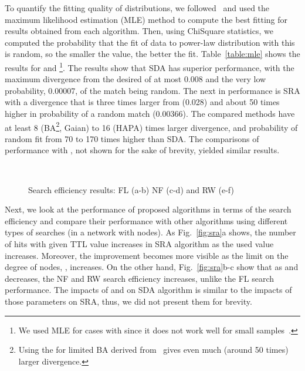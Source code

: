 \documentclass[10pt,journal,cspaper,compsoc]{IEEEtran}
\begin{document}
To quantify the fitting quality of distributions, we followed~\cite{powerlaw1} and used the maximum likelihood estimation (MLE) method to compute the best fitting  for results obtained from each algorithm. Then, using ChiSquare statistics, we computed the probability that the fit of data to power-law distribution with this  is random, so the smaller the value, the better the fit. Table~\ref{table:mle} shows the results for  and  \footnote{We used MLE for cases with  since it does not work well for small samples~\cite{powerlaw1}.}. The results show that SDA has superior performance, with the maximum divergence from the desired  of at most 0.008 and the very low probability, 0.00007, of the match being random. The next in performance is SRA with a divergence that is three times larger from  (0.028) and about 50 times higher in probability of a random match (0.00366). The compared methods have at least 8 (BA\footnote{Using the  for limited BA derived from~\cite{guclu} gives even much (around 50 times) larger divergence.}, Gaian) to 16 (HAPA) times larger divergence, and probability of random fit from 70 to 170 times higher than SDA. The comparisons of performance with , not shown for the sake of brevity, yielded similar results.


\begin{figure*}
\centering
{}
\\
\caption{Search efficiency results: FL (a-b) NF (c-d) and RW (e-f)}
\label{fig:comparison}
\end{figure*}

Next, we look at the performance of proposed algorithms in terms of the search efficiency and compare their performance with other algorithms using different types of searches (in a network with  nodes). As Fig.~\ref{fig:sra}a shows, the number of hits with given TTL value increases in SRA algorithm as the used  value increases. Moreover, the improvement becomes more visible as the limit on the degree of nodes, , increases. On the other hand, Fig.~\ref{fig:sra}b-c show that as  and  decreases, the NF and RW search efficiency increases, unlike the FL search performance. The impacts of  and  on SDA algorithm is similar to the impacts of those parameters on SRA, thus, we did not present them for brevity. 
\end{document}
